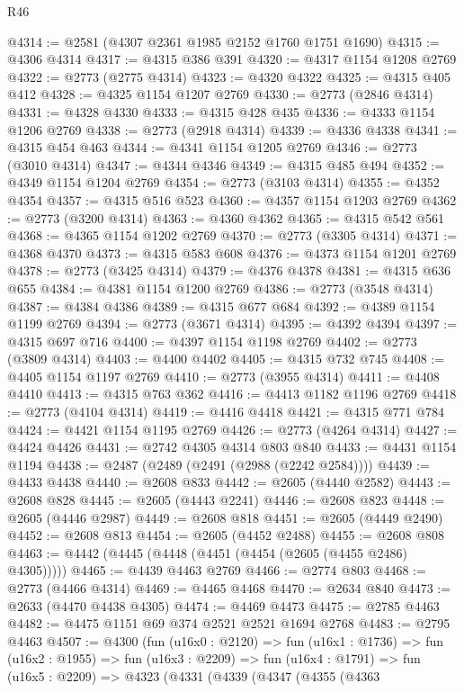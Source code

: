 \begin{lexlean}{R46}
\begin{coremodule}
@4314 := @2581 (@4307 @2361 @1985 @2152 @1760 @1751 @1690)
@4315 := @4306 @4314
@4317 := @4315 @386 @391
@4320 := @4317 @1154 @1208 @2769
@4322 := @2773 (@2775 @4314)
@4323 := @4320 @4322
@4325 := @4315 @405 @412
@4328 := @4325 @1154 @1207 @2769
@4330 := @2773 (@2846 @4314)
@4331 := @4328 @4330
@4333 := @4315 @428 @435
@4336 := @4333 @1154 @1206 @2769
@4338 := @2773 (@2918 @4314)
@4339 := @4336 @4338
@4341 := @4315 @454 @463
@4344 := @4341 @1154 @1205 @2769
@4346 := @2773 (@3010 @4314)
@4347 := @4344 @4346
@4349 := @4315 @485 @494
@4352 := @4349 @1154 @1204 @2769
@4354 := @2773 (@3103 @4314)
@4355 := @4352 @4354
@4357 := @4315 @516 @523
@4360 := @4357 @1154 @1203 @2769
@4362 := @2773 (@3200 @4314)
@4363 := @4360 @4362
@4365 := @4315 @542 @561
@4368 := @4365 @1154 @1202 @2769
@4370 := @2773 (@3305 @4314)
@4371 := @4368 @4370
@4373 := @4315 @583 @608
@4376 := @4373 @1154 @1201 @2769
@4378 := @2773 (@3425 @4314)
@4379 := @4376 @4378
@4381 := @4315 @636 @655
@4384 := @4381 @1154 @1200 @2769
@4386 := @2773 (@3548 @4314)
@4387 := @4384 @4386
@4389 := @4315 @677 @684
@4392 := @4389 @1154 @1199 @2769
@4394 := @2773 (@3671 @4314)
@4395 := @4392 @4394
@4397 := @4315 @697 @716
@4400 := @4397 @1154 @1198 @2769
@4402 := @2773 (@3809 @4314)
@4403 := @4400 @4402
@4405 := @4315 @732 @745
@4408 := @4405 @1154 @1197 @2769
@4410 := @2773 (@3955 @4314)
@4411 := @4408 @4410
@4413 := @4315 @763 @362
@4416 := @4413 @1182 @1196 @2769
@4418 := @2773 (@4104 @4314)
@4419 := @4416 @4418
@4421 := @4315 @771 @784
@4424 := @4421 @1154 @1195 @2769
@4426 := @2773 (@4264 @4314)
@4427 := @4424 @4426
@4431 := @2742 @4305 @4314 @803 @840
@4433 := @4431 @1154 @1194
@4438 := @2487 (@2489 (@2491 (@2988 (@2242 @2584))))
@4439 := @4433 @4438
@4440 := @2608 @833
@4442 := @2605 (@4440 @2582)
@4443 := @2608 @828
@4445 := @2605 (@4443 @2241)
@4446 := @2608 @823
@4448 := @2605 (@4446 @2987)
@4449 := @2608 @818
@4451 := @2605 (@4449 @2490)
@4452 := @2608 @813
@4454 := @2605 (@4452 @2488)
@4455 := @2608 @808
@4463 := @4442 (@4445 (@4448 (@4451 (@4454 (@2605 (@4455 @2486) @4305)))))
@4465 := @4439 @4463 @2769
@4466 := @2774 @803
@4468 := @2773 (@4466 @4314)
@4469 := @4465 @4468
@4470 := @2634 @840
@4473 := @2633 (@4470 @4438 @4305)
@4474 := @4469 @4473
@4475 := @2785 @4463
@4482 := @4475 @1151 @69 @374 @2521 @2521 @1694 @2768
@4483 := @2795 @4463
@4507 := @4300
    (fun (u16x0 : @2120) =>
    fun (u16x1 : @1736) =>
    fun (u16x2 : @1955) =>
    fun (u16x3 : @2209) =>
    fun (u16x4 : @1791) =>
    fun (u16x5 : @2209) =>
    @4323
      (@4331
        (@4339
          (@4347
            (@4355
              (@4363

\end{coremodule}
\end{lexlean}
